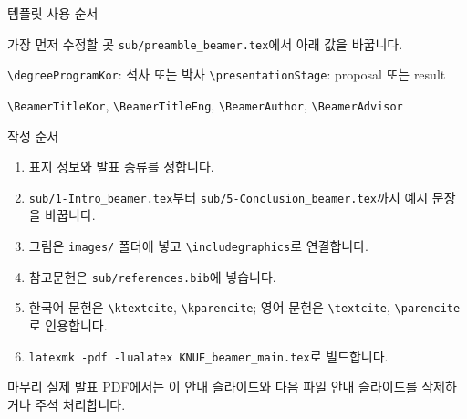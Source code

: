 \documentclass{KNUE_beamer_class}
\title[\BeamerShortTitle]{\texorpdfstring{%
  \begin{minipage}{0.92\linewidth}
  \centering
  \BeamerTitleKor\\[0.18cm]
  {\footnotesize\linespread{0.86}\selectfont(\BeamerTitleEng)\par}
  \end{minipage}%
}{\BeamerTitleKor}}
\subtitle{\texorpdfstring{\BeamerSubtitleKor\\{\scriptsize\BeamerSubtitleEng}}{\BeamerSubtitleKor / \BeamerSubtitleEng}}
\author[\BeamerAuthor]{\texorpdfstring{\BeamerAdvisor\\[0.2cm]\BeamerAuthor}{\BeamerAuthor}}
\institute{\BeamerInstitute}
\date{\BeamerDate}
\begin{document}
\begin{frame}[plain]
  \titlepage
\end{frame}

\begin{frame}[t]{템플릿 사용 순서}
\scriptsize

\begin{alertblock}{가장 먼저 수정할 곳}
\texttt{sub/preamble\_beamer.tex}에서 아래 값을 바꿉니다.

\texttt{\textbackslash degreeProgramKor}: 석사 또는 박사 \quad
\texttt{\textbackslash presentationStage}: proposal 또는 result

\texttt{\textbackslash BeamerTitleKor}, \texttt{\textbackslash BeamerTitleEng}, \texttt{\textbackslash BeamerAuthor}, \texttt{\textbackslash BeamerAdvisor}
\end{alertblock}

\begin{block}{작성 순서}
\begin{enumerate}
\tightitems
\item 표지 정보와 발표 종류를 정합니다.
\item \texttt{sub/1-Intro\_beamer.tex}부터 \texttt{sub/5-Conclusion\_beamer.tex}까지 예시 문장을 바꿉니다.
\item 그림은 \texttt{images/} 폴더에 넣고 \texttt{\textbackslash includegraphics}로 연결합니다.
\item 참고문헌은 \texttt{sub/references.bib}에 넣습니다.
\item 한국어 문헌은 \texttt{\textbackslash ktextcite}, \texttt{\textbackslash kparencite}; 영어 문헌은 \texttt{\textbackslash textcite}, \texttt{\textbackslash parencite}로 인용합니다.
\item \texttt{latexmk -pdf -lualatex KNUE\_beamer\_main.tex}로 빌드합니다.
\end{enumerate}
\end{block}

\begin{exampleblock}{마무리}
실제 발표 PDF에서는 이 안내 슬라이드와 다음 파일 안내 슬라이드를 삭제하거나 주석 처리합니다.
\end{exampleblock}
\end{frame}
\end{document}
